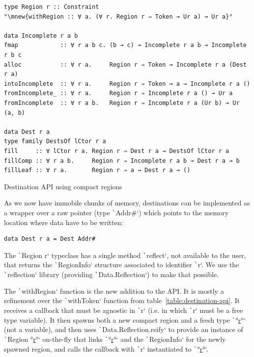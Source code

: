 \documentclass[english]{jflart}
\newcommand{\mnew}[1]{\colorbox{green}{#1}}
\newcommand{\muline}[1]{\uline{#1}}
\begin{document}
\begin{table}[t]
\small
\begin{verbatim}
type Region r :: Constraint
°\mnew{withRegion :: ∀ a. (∀ r. Region r ⇒ Token ⊸ Ur a) ⊸ Ur a}°

data Incomplete r a b
fmap            :: ∀ r a b c. (b ⊸ c) ⊸ Incomplete r a b ⊸ Incomplete r b c
alloc           :: ∀ r a.     Region r ⇒ Token ⊸ Incomplete r a (Dest r a)
intoIncomplete  :: ∀ r a.     Region r ⇒ Token ⊸ a → Incomplete r a ()
fromIncomplete_ :: ∀ r a.     Region r ⇒ Incomplete r a () ⊸ Ur a
fromIncomplete  :: ∀ r a b.   Region r ⇒ Incomplete r a (Ur b) ⊸ Ur (a, b)

data Dest r a
type family DestsOf lCtor r a
fill     :: ∀ lCtor r a. Region r ⇒ Dest r a → DestsOf lCtor r a
fillComp :: ∀ r a b.     Region r ⇒ Incomplete r a b ⊸ Dest r a ⊸ b
fillLeaf :: ∀ r a.       Region r ⇒ a → Dest r a ⊸ ()
\end{verbatim}
\caption{Destination API using compact regions}
\label{table:destination-api-regions}
\end{table}

As we now have immobile chunks of memory, destinations can be implemented as a wrapper over a raw pointer (type \texttt`Addr#`) which points to the memory location where data have to be written:

{\small
\begin{verbatim}
data Dest r a = Dest Addr#
\end{verbatim}
}

The \texttt`Region r` typeclass has a single method \texttt`reflect`, not available to the user, that returns the \texttt`RegionInfo` structure associated to identifier \texttt`r`. We use the \texttt`reflection` library (providing \texttt`Data.Reflection`) to make that possible.

The \texttt`withRegion` function is the new addition to the API. It is mostly a refinement over the \texttt`withToken` function from table~\ref{table:destination-api}. It receives a callback that must be agnostic in \texttt`r` (i.e. in which \texttt`r` must be a free type variable). It then spawns both a new compact region and a fresh type \texttt`°\muline{r}°` (not a variable), and then uses \texttt`Data.Reflection.reify` to provide an instance of \texttt`Region °\muline{r}°` on-the-fly that links \texttt`°\muline{r}°` and the \texttt`RegionInfo` for the newly spawned region, and calls the callback with \texttt`r` instantiated to \texttt`°\muline{r}°`.
\end{document}
